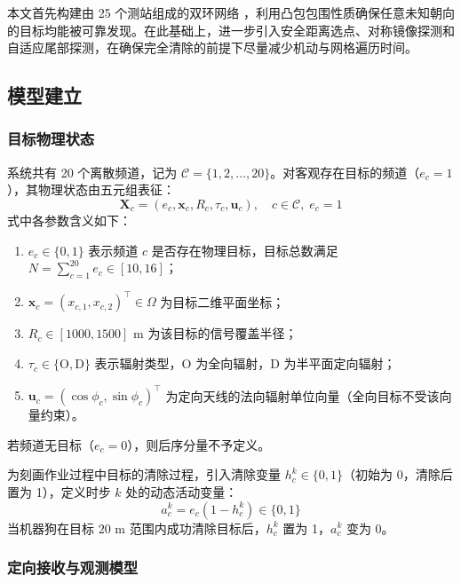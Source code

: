 \documentclass[zihao=-4,a4paper,UTF8]{ctexart}
\begin{document}
本文首先构建由 25 个测站组成的双环网络 \cite{guvensan2011}，利用凸包包围性质确保任意未知朝向的目标均能被可靠发现。在此基础上，进一步引入安全距离选点、对称镜像探测和自适应尾部探测，在确保完全清除的前提下尽量减少机动与网格遍历时间。

\subsection{模型建立}

\subsubsection{目标物理状态}

系统共有 20 个离散频道，记为 $\mathcal{C} = \{1, 2, \dots, 20\}$。对客观存在目标的频道（$e_c = 1$），其物理状态由五元组表征：
\begin{equation}
    \mathbf{X}_c = (e_c, \mathbf{x}_c, R_{c}, \tau_c, \mathbf{u}_c), \quad c \in \mathcal{C}, \; e_c = 1
\end{equation}
式中各参数含义如下：
\begin{enumerate}[leftmargin=2.2em, itemsep=0.02em, topsep=0.02em]
    \item $e_c \in \{0, 1\}$ 表示频道 $c$ 是否存在物理目标，目标总数满足 $N = \sum_{c=1}^{20} e_c \in [10, 16]$；
    \item $\mathbf{x}_c = (x_{c,1}, x_{c,2})^\top \in \Omega$ 为目标二维平面坐标；
    \item $R_{c} \in [1000, 1500]\text{ m}$ 为该目标的信号覆盖半径；
    \item $\tau_c \in \{\mathrm{O}, \mathrm{D}\}$ 表示辐射类型，$\mathrm{O}$ 为全向辐射，$\mathrm{D}$ 为半平面定向辐射；
    \item $\mathbf{u}_c = (\cos\phi_c, \sin\phi_c)^\top$ 为定向天线的法向辐射单位向量（全向目标不受该向量约束）。
\end{enumerate}
若频道无目标（$e_c = 0$），则后序分量不予定义。

为刻画作业过程中目标的清除过程，引入清除变量 $h_c^k \in \{0, 1\}$（初始为 0，清除后置为 1），定义时步 $k$ 处的动态活动变量：
\begin{equation}
    a_c^k = e_c (1 - h_c^k) \in \{0, 1\}
\end{equation}
当机器狗在目标 $20\text{ m}$ 范围内成功清除目标后，$h_c^k$ 置为 1，$a_c^k$ 变为 0。

\subsubsection{定向接收与观测模型}
\end{document}
